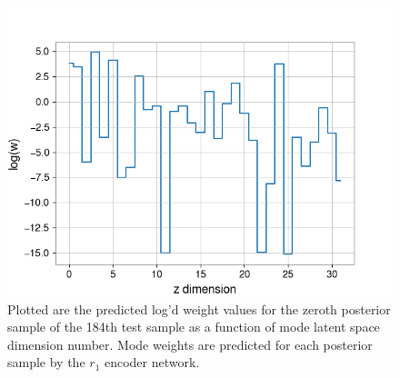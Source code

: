%
%
\begin{figure}
    \includegraphics[width=\columnwidth]{figures/latent_logweight_pub_plot_event_184.png}
    \caption[Latent space log weight plot for the 184th test sample in the \texttt{VItamin} paper training set.]{\label{fig:log_weight_184} Plotted are the predicted log'd weight values for the zeroth posterior sample of the 184th test sample as a function of mode latent space dimension number. Mode weights are predicted for each posterior sample by the $r_1$ encoder network.}
\end{figure}

